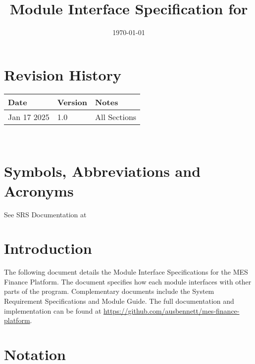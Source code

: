 \documentclass[12pt, titlepage]{article}
\begin{document}
\title{Module Interface Specification for \progname{}}

\author{\authname}

\date{\today}

\maketitle


\section{Revision History}

\begin{tabularx}{\textwidth}{p{3cm}p{2cm}X}
\toprule {\bf Date} & {\bf Version} & {\bf Notes}\\
\midrule
Jan 17 2025 & 1.0 & All Sections\\
\bottomrule
\end{tabularx}

~\newpage

\section{Symbols, Abbreviations and Acronyms}

See SRS Documentation at 


\newpage

\tableofcontents

\newpage


\section{Introduction}

The following document details the Module Interface Specifications for
the MES Finance Platform. The document specifies how each module interfaces with other parts of the program. Complementary documents include the System Requirement Specifications and Module Guide.  The full documentation and implementation can be found at \url{https://github.com/ausbennett/mes-finance-platform}.

\section{Notation}
\end{document}
